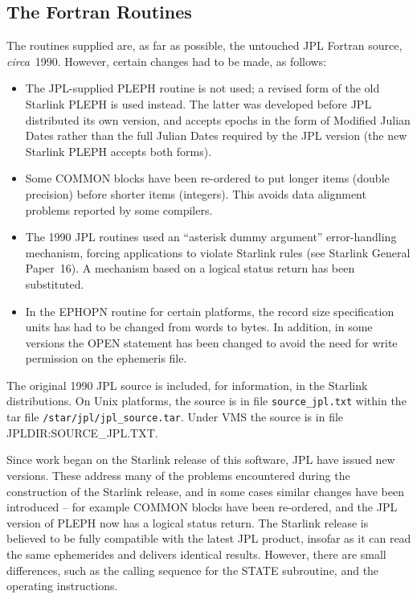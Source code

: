 \subsection{The Fortran Routines}
The routines supplied are, as far as possible, the
untouched JPL Fortran source, {\it circa}\/~1990.  However,
certain changes had to be made, as follows:
\begin{itemize}
\item The JPL-supplied PLEPH routine is not used;  a revised form of the
old Starlink PLEPH is used instead.  The latter was developed
before JPL distributed its own version, and accepts epochs
in the form of Modified Julian Dates rather than the full
Julian Dates required by the JPL
version (the new Starlink PLEPH accepts both forms).
\item Some COMMON blocks have been re-ordered to put longer
items (double precision) before shorter items (integers).
This avoids data alignment problems reported by some
compilers.
\item The 1990 JPL routines used an
``asterisk dummy argument'' error-handling
mechanism, forcing applications to violate Starlink
rules (see Starlink General Paper~16).  A mechanism based on
a logical status return has been substituted.
\item In the EPHOPN routine for certain platforms, the record
size specification units
has had to be changed from words to bytes.  In addition, in some
versions the OPEN statement has been changed to avoid the need
for write permission on the ephemeris file.
\end{itemize}
The original 1990 JPL source is included, for information, in the
Starlink distributions.  On Unix platforms, the source is in
file \verb|source_jpl.txt| within the tar file
\verb|/star/jpl/jpl_source.tar|.  Under VMS the source is in
file JPLDIR:SOURCE\_JPL.TXT.

Since work began on the Starlink release of this software, JPL
have issued new versions.  These address many of the problems
encountered during the construction of the Starlink release,
and in some cases similar changes have been introduced -- for
example COMMON blocks have been re-ordered, and
the JPL version of PLEPH now has a logical status
return.  The Starlink release is believed to be fully
compatible with the latest JPL product, insofar as it can
read the same ephemerides and delivers identical results.
However, there are small differences, such as the calling
sequence for the STATE subroutine, and the operating
instructions.

